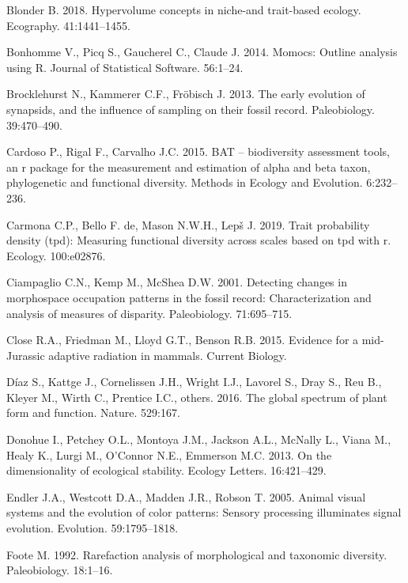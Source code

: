 \documentclass[]{article}
\begin{document}
\hypertarget{ref-blonder2018}{}
Blonder B. 2018. Hypervolume concepts in niche-and trait-based ecology.
Ecography. 41:1441--1455.

\hypertarget{ref-momocs}{}
Bonhomme V., Picq S., Gaucherel C., Claude J. 2014. Momocs: Outline
analysis using R. Journal of Statistical Software. 56:1--24.

\hypertarget{ref-brocklehurst2013}{}
Brocklehurst N., Kammerer C.F., Fröbisch J. 2013. The early evolution of
synapsids, and the influence of sampling on their fossil record.
Paleobiology. 39:470--490.

\hypertarget{ref-bat2015}{}
Cardoso P., Rigal F., Carvalho J.C. 2015. BAT -- biodiversity assessment
tools, an r package for the measurement and estimation of alpha and beta
taxon, phylogenetic and functional diversity. Methods in Ecology and
Evolution. 6:232--236.

\hypertarget{ref-carmona2019}{}
Carmona C.P., Bello F. de, Mason N.W.H., Lepš J. 2019. Trait probability
density (tpd): Measuring functional diversity across scales based on tpd
with r. Ecology. 100:e02876.

\hypertarget{ref-ciampaglio2001}{}
Ciampaglio C.N., Kemp M., McShea D.W. 2001. Detecting changes in
morphospace occupation patterns in the fossil record: Characterization
and analysis of measures of disparity. Paleobiology. 71:695--715.

\hypertarget{ref-close2015}{}
Close R.A., Friedman M., Lloyd G.T., Benson R.B. 2015. Evidence for a
mid-Jurassic adaptive radiation in mammals. Current Biology.

\hypertarget{ref-diaz2016}{}
Díaz S., Kattge J., Cornelissen J.H., Wright I.J., Lavorel S., Dray S.,
Reu B., Kleyer M., Wirth C., Prentice I.C., others. 2016. The global
spectrum of plant form and function. Nature. 529:167.

\hypertarget{ref-donohue2013}{}
Donohue I., Petchey O.L., Montoya J.M., Jackson A.L., McNally L., Viana
M., Healy K., Lurgi M., O'Connor N.E., Emmerson M.C. 2013. On the
dimensionality of ecological stability. Ecology Letters. 16:421--429.

\hypertarget{ref-endler2005}{}
Endler J.A., Westcott D.A., Madden J.R., Robson T. 2005. Animal visual
systems and the evolution of color patterns: Sensory processing
illuminates signal evolution. Evolution. 59:1795--1818.

\hypertarget{ref-foote1992}{}
Foote M. 1992. Rarefaction analysis of morphological and taxonomic
diversity. Paleobiology. 18:1--16.
\end{document}
